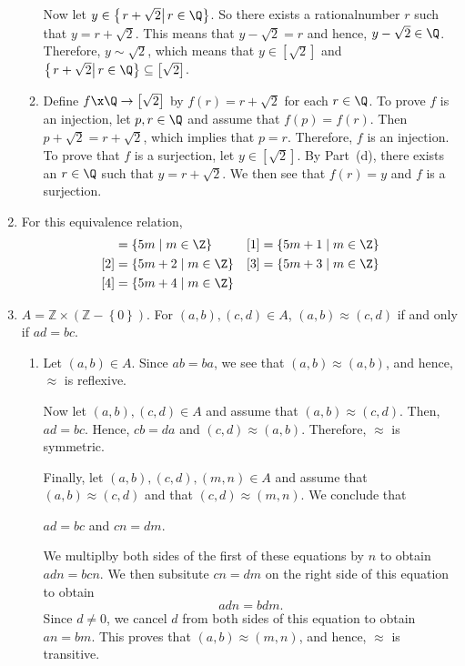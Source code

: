 \begin{enumerate}
\begin{enumerate}
Now let $y \in \left\{ \left. r + \sqrt{2} \right| r \in \Q \right\}$.  So there exists a rationalnumber  $r$ such that $y = r + \sqrt{2}$.  This means that $y - \sqrt{2} = r$ and hence, $y - \sqrt{2} \in \Q$.  Therefore, $y \sim \sqrt{2}$, which means that 
$y \in \left[ \sqrt{2} \right]$ and 
$\left\{ \left. r + \sqrt{2} \right| r \in \Q \right\} \subseteq \left[ \sqrt{2} \right]$.

\item Define $f\x \Q \to \left[ \sqrt{2} \right]$ by $f(r) = r + \sqrt{2}$ for each $r \in \Q$.  To prove $f$ is an injection, let $p, r \in \Q$ and assume that 
$f(p) = f(r)$.  Then $p + \sqrt{2} = r + \sqrt{2}$, which implies that $p = r$.  Therefore, $f$ is an injection.  To prove that $f$ is a surjection, let 
$y \in  \left[ \sqrt{2} \right]$.  By Part~(d), there exists an $r \in \Q$ such that 
$y = r + \sqrt{2}$.  We then see that $f(r) = y$ and $f$ is a surjection.
\end{enumerate}


\item For this equivalence relation,
\begin{align*}
[0] &= \{ 5m \mid m \in \Z \} & [1] &= \{ 5m + 1 \mid m \in \Z \} \\
[2] &= \{ 5m + 2 \mid m \in \Z \}  &  [3] &= \{ 5m + 3 \mid m \in \Z \} \\
[4] &= \{ 5m + 4 \mid m \in \Z \}
\end{align*}



\item $A = \mathbb{Z} \times \left( {\mathbb{Z} - \left\{ 0 \right\}} \right)$.  For  
$\left( {a, b} \right), \left( {c, d} \right) \in A$,  
$\left( {a, b} \right) \approx \left( {c, d} \right)$ if and only if  $ad = bc$.

\begin{enumerate}
\item Let $\left( a, b \right) \in A$.  Since $ab = ba$, we see that 
$\left( a, b \right) \approx \left( a, b \right)$, and hence, $\approx$ is reflexive.

Now let $\left( a, b \right), \left( c, d \right) \in A$ and assume that 
$\left( a, b \right) \approx \left( c, d \right)$.  Then, $ad = bc$.  Hence, $cb = da$ and 
$\left( c, d \right) \approx \left( a, b \right)$.  Therefore, $\approx$ is symmetric.

Finally, let $\left( a, b \right), \left( c, d \right), \left( m, n \right) \in A$ and assume that 
$\left( a, b \right) \approx \left( c, d \right)$ and that 
$\left( c, d \right) \approx \left( m, n \right)$.  We conclude that
\begin{center}
$ad = bc$ and $cn = dm$.
\end{center}
We multiplby both sides of the first of these equations by $n$ to obtain $adn = bcn$.  We then subsitute $cn = dm$ on the right side of this equation to obtain
\[
adn = bdm.
\]
Since $d \ne 0$, we cancel $d$ from both sides of this equation to obtain $an = bm$.  This proves that $\left( a, b \right) \approx \left( m, n \right)$, and hence, $\approx$ is transitive.


\end{enumerate}
\end{enumerate}
